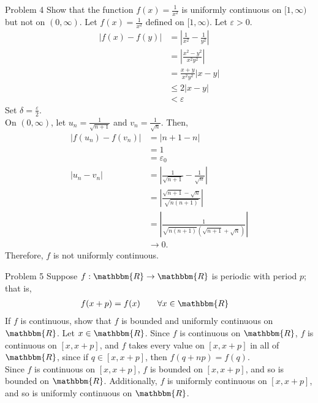 \documentclass[10pt]{extarticle}
\newcommand{\R}{\mathbbm{R}}
\begin{document}
  \begin{problem}{Problem 4}
    Show that the function $f(x) = \frac{1}{x^2}$ is uniformly continuous on $[1,\infty)$ but not on $(0,\infty)$.
    \tcblower
    Let $f(x) = \frac{1}{x^2}$ defined on $[1,\infty)$. Let $\varepsilon > 0$.
    \begin{align*}
      \left|f(x) - f(y)\right| &= \left|\frac{1}{x^2}-\frac{1}{y^2}\right|\\
                               &= \left|\frac{x^2 - y^2}{x^2y^2}\right|\\
                               &= \frac{x+y}{x^2y^2}\left|x - y\right|\\
                               & \leq 2\left|x-y\right|\\
                               &< \varepsilon
    \end{align*}
    Set $\delta = \frac{\varepsilon}{2}$.\\

    On $(0,\infty)$, let $u_n = \frac{1}{\sqrt{n+1}}$ and $v_n = \frac{1}{\sqrt{n}}$. Then,
    \begin{align*}
      \left|f(u_n) - f(v_n)\right| &= \left|n+1 - n\right|\\
                                   &= 1\\
                                   &= \varepsilon_0\\
      \left|u_n - v_n\right| &= \left|\frac{1}{\sqrt{n+1}} - \frac{1}{\sqrt{n}}\right|\\
                             &= \left|\frac{\sqrt{n+1} - \sqrt{n}}{\sqrt{n(n+1)}}\right|\\
                             &= \left|\frac{1}{\sqrt{n(n+1)}\left(\sqrt{n+1} + \sqrt{n}\right)}\right|\\
                             &\rightarrow 0.
    \end{align*}
    Therefore, $f$ is not uniformly continuous.
  \end{problem}
  \begin{problem}{Problem 5}
    Suppose $f: \R\rightarrow \R$ is periodic with period $p$; that is,
    \begin{align*}
      f(x+p) &= f(x)\tag*{$\forall x\in\R$}
    \end{align*}
    If $f$ is continuous, show that $f$ is bounded and uniformly continuous on $\R$.
    \tcblower
    Let $x\in\R$. Since $f$ is continuous on $\R$, $f$ is continuous on $[x,x+p]$, and $f$ takes every value on $[x,x+p]$ in all of $\R$, since if $q\in [x,x+p]$, then $f(q+np) = f(q)$.\\

    Since $f$ is continuous on $[x,x+p]$, $f$ is bounded on $[x,x+p]$, and so is bounded on $\R$. Additionally, $f$ is uniformly continuous on $[x,x+p]$, and so is uniformly continuous on $\R$.
  \end{problem}
\end{document}
